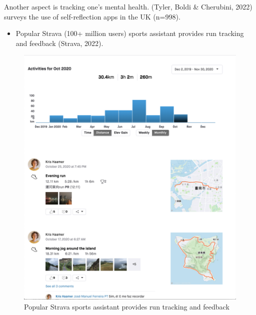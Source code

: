 \documentclass[
  letterpaper,
  DIV=11,
  numbers=noendperiod]{scrartcl}
\providecommand{\tightlist}{%
  \setlength{\itemsep}{0pt}\setlength{\parskip}{0pt}}\usepackage{longtable,booktabs,array}
\begin{document}
Another aspect is tracking one's mental health. (Tyler, Boldi \&
Cherubini, 2022) surveys the use of self-reflection apps in the UK
(n=998).

\begin{itemize}
\tightlist
\item
  Popular Strava (100+ million users) sports assistant provides run
  tracking and feedback (Strava, 2022).
\end{itemize}

\begin{figure}[H]

{\centering \includegraphics[width=1\textwidth,height=\textheight]{./images/design/strava.png}

}

\caption{Popular Strava sports assistant provides run tracking and
feedback}

\end{figure}%
\end{document}

